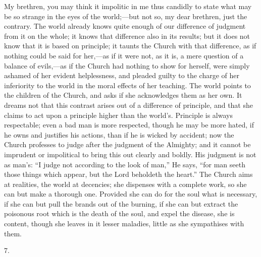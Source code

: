 My brethren, you may think it impolitic in me thus candidly to
state what may be so strange in the eyes of the world;—but not so,
my dear brethren, just the contrary. The world already knows quite
enough of our difference of judgment from it on the whole; it knows
that difference also in its results; but it does not know that it is
based on principle; it taunts the Church with that difference, as if
nothing could be said for her,—as if it were not, as it is, a mere
question of a balance of evils,—as if the Church had nothing to show
for herself, were simply ashamed of her evident helplessness, and
pleaded guilty to the charge of her inferiority to the world in the
moral effects of her teaching. The world points to the children of the
Church, and asks if she acknowledges them as her own. It dreams not
that this contrast arises out of a difference of principle, and that
she claims to act upon a principle higher than the world's. Principle
is always respectable; even a bad man is more respected, though he may
be more hated, if he owns and justifies his actions, than if he is
wicked by accident; now the Church professes to judge after the
judgment of the Almighty; and it cannot be imprudent or impolitical
to
bring this out clearly and boldly. His judgment is not as man's:
``I judge not according to the look of man,'' He says,
``for man seeth those things which appear, but the Lord beholdeth
the heart.'' The Church aims at realities, the world at decencies;
she dispenses with a complete work, so she can but make a thorough
one. Provided she can do for the soul what is necessary, if she can
but pull the brands out of the burning, if she can but extract the
poisonous root which is the death of the soul, and expel the disease,
she is content, though she leaves in it lesser maladies, little as she
sympathises with them.

7.

